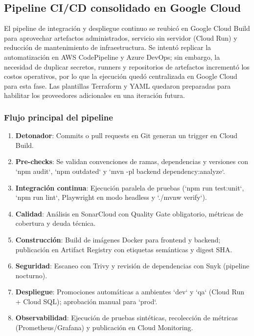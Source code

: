 \documentclass[12pt,a4paper]{article}
\begin{document}
\subsection{Pipeline CI/CD consolidado en Google Cloud}

El pipeline de integración y despliegue continuo se reubicó en Google Cloud Build para aprovechar artefactos administrados, servicio sin servidor (Cloud Run) y reducción de mantenimiento de infraestructura. Se intentó replicar la automatización en AWS CodePipeline y Azure DevOps; sin embargo, la necesidad de duplicar secretos, runners y repositorios de artefactos incrementó los costos operativos, por lo que la ejecución quedó centralizada en Google Cloud para esta fase. Las plantillas Terraform y YAML quedaron preparadas para habilitar los proveedores adicionales en una iteración futura.

\subsubsection{Flujo principal del pipeline}

\begin{enumerate}[leftmargin=1.2cm]
    \item \textbf{Detonador}: Commits o pull requests en Git generan un trigger en Cloud Build.
    \item \textbf{Pre-checks}: Se validan convenciones de ramas, dependencias y versiones con `npm audit`, `npm outdated` y `mvn -pl backend dependency:analyze`.
    \item \textbf{Integración continua}: Ejecución paralela de pruebas (`npm run test:unit`, `npm run lint`, Playwright en modo headless y `./mvnw verify`).
    \item \textbf{Calidad}: Análisis en SonarCloud con Quality Gate obligatorio, métricas de cobertura y deuda técnica.
    \item \textbf{Construcción}: Build de imágenes Docker para frontend y backend; publicación en Artifact Registry con etiquetas semánticas y digest SHA.
    \item \textbf{Seguridad}: Escaneo con Trivy y revisión de dependencias con Snyk (pipeline nocturno).
    \item \textbf{Despliegue}: Promociones automáticas a ambientes `dev` y `qa` (Cloud Run + Cloud SQL); aprobación manual para `prod`.
    \item \textbf{Observabilidad}: Ejecución de pruebas sintéticas, recolección de métricas (Prometheus/Grafana) y publicación en Cloud Monitoring.
\end{enumerate}
\end{document}

